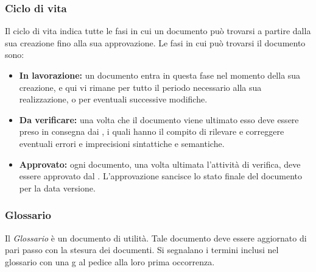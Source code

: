 \subsubsection{Ciclo di vita}
Il ciclo di vita indica tutte le fasi in cui un documento può trovarsi a partire dalla sua creazione fino alla sua approvazione. Le fasi in cui può trovarsi il documento sono:
\begin{itemize}
	\item \textbf{In lavorazione:} un documento entra in questa fase nel momento della sua creazione, e qui vi rimane per tutto il periodo necessario alla sua realizzazione, o per eventuali successive modifiche. 
	\item \textbf{Da verificare:} una volta che il documento viene ultimato esso deve essere preso in consegna dai \Verificatori{}, i quali hanno il compito di rilevare e correggere eventuali errori e imprecisioni sintattiche e semantiche. 
	\item \textbf{Approvato:} ogni documento, una volta ultimata l'attività di verifica, deve essere approvato dal \Responsabile{}. L'approvazione sancisce lo stato finale del documento per la data versione.
\end{itemize}

\subsubsection{Glossario}
Il \textit{Glossario} è un documento di utilità. Tale documento deve essere aggiornato di pari passo con la stesura dei documenti.
Si segnalano i termini inclusi nel glossario con una g al pedice alla loro prima occorrenza. 
